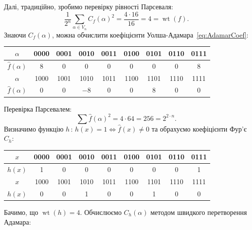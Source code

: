 Далі, традиційно, зробимо перевірку рівності Парсеваля:
\begin{equation*}
    \frac{1}{2^n}\sum\limits_{\alpha \in V_n} C_f(\alpha)^2 = \frac{4 \cdot 16}{16} = 4 = \operatorname{wt}(f).
\end{equation*}
Знаючи $C_f(\alpha)$, можна обчислити коефіцієнти Уолша-Адамара~\eqref{eq:AdamarCoef}:
\begin{center}
    \renewcommand{\arraystretch}{1.2}
    \begin{tabular}{c|cccccccc}
        $\alpha$          & 0000 & 0001 & 0010 & 0011 & 0100 & 0101 & 0110 & 0111 \\
        \hline
        $\hat{f}(\alpha)$ & 8    & 0    & 0    & 0    & 0    & 0    & 0    & 8    \\
        \noalign{\smallskip} \hline \noalign{\smallskip}
        $\alpha$          & 1000 & 1001 & 1010 & 1011 & 1100 & 1101 & 1110 & 1111 \\
        \hline
        $\hat{f}(\alpha)$ & 0    & 0    & $-8$ & 0    & 0    & 8    & 0    & 0    \\
    \end{tabular}
\end{center}
Перевірка Парсевалем:
\begin{equation*}
    \sum \hat{f}(\alpha)^2 = 4 \cdot 64 = 256 = 2^{2 \cdot n}.
\end{equation*}
Визначимо функцію $h \, : \, h(x) = 1 \Leftrightarrow \hat{f}(x) \neq 0$ та обрахуємо коефіцієнти Фур'є $C_h$:
\begin{center}
    \renewcommand{\arraystretch}{1.2}
    \begin{tabular}{c|cccccccc}
        $x$    & 0000 & 0001 & 0010 & 0011 & 0100 & 0101 & 0110 & 0111 \\
        \hline
        $h(x)$ & 1    & 0    & 0    & 0    & 0    & 0    & 0    & 1    \\
        \noalign{\smallskip} \hline \noalign{\smallskip}
        $x$    & 1000 & 1001 & 1010 & 1011 & 1100 & 1101 & 1110 & 1111 \\
        \hline
        $h(x)$ & 0    & 0    & 1    & 0    & 0    & 1    & 0    & 0    \\
    \end{tabular}
\end{center}
Бачимо, що $\operatorname{wt}(h) = 4$. Обчислюємо $C_h(\alpha)$ методом швидкого перетворення Адамара:
\newpage
